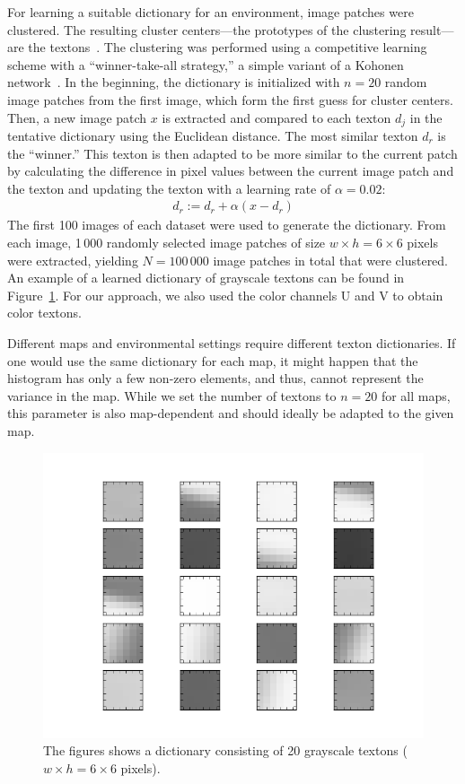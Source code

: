 \documentclass[11pt]{report}
\begin{document}
For learning a suitable dictionary for an environment, image patches
were clustered. The resulting cluster centers---the prototypes of the
clustering result---are the textons~\cite{varma2003texture}. The
clustering was performed using a competitive learning scheme with a
``winner-take-all strategy,'' a simple variant of a Kohonen
network~\cite{kohonen1990self}. In the beginning, the dictionary is
initialized with $n = 20$ random image patches from the first image,
which form the first guess for cluster centers. Then, a new image
patch $x$ is extracted and compared to each texton $d_j$ in the
tentative dictionary using the Euclidean distance. The most similar
texton $d_r$ is the ``winner.'' This texton is then adapted to be more
similar to the current patch by calculating the difference in pixel
values between the current image patch and the texton and updating the
texton with a learning rate of $\alpha = 0.02$:
\begin{align*}
  d_r := d_r + \alpha (x - d_r)
\end{align*}
The first 100 images of each dataset were used to generate the
dictionary. From each image, 1\,000 randomly selected image patches of
size $w \times h = 6 \times 6$ pixels were extracted, yielding
$N = 100\,000$ image patches in total that were clustered. An example
of a learned dictionary of grayscale textons can be found in
Figure~\ref{fig:dictionary}. For our approach, we also used the color
channels U and V to obtain color textons.

Different maps and environmental settings require different texton
dictionaries. If one would use the same dictionary for each map, it
might happen that the histogram has only a few non-zero elements, and
thus, cannot represent the variance in the map. While we set the
number of textons to $n = 20$ for all maps, this parameter is also
map-dependent and should ideally be adapted to the given map.

\begin{figure}[h!]
\begin{center}
\includegraphics[width=0.7\columnwidth]{dict}
\caption{{\label{fig:dictionary} The figures shows a dictionary
    consisting of 20 grayscale textons ($w \times h = 6 \times 6$
    pixels).}}
\end{center}
\end{figure}
\end{document}
